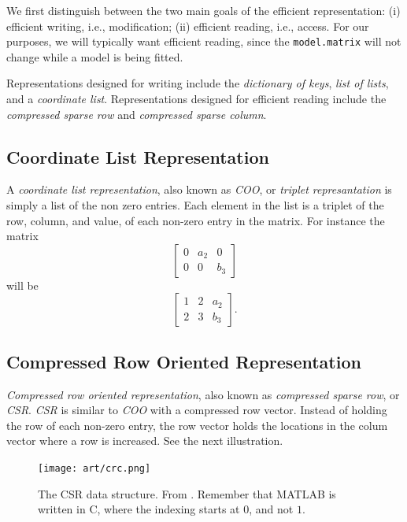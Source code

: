 \documentclass[]{book}
\theoremstyle{definition}
\theoremstyle{definition}
\theoremstyle{definition}
\theoremstyle{remark}
\begin{document}
We first distinguish between the two main goals of the efficient representation:
(i) efficient writing, i.e., modification;
(ii) efficient reading, i.e., access.
For our purposes, we will typically want efficient reading, since the \texttt{model.matrix} will not change while a model is being fitted.

Representations designed for writing include the \emph{dictionary of keys}, \emph{list of lists}, and a \emph{coordinate list}.
Representations designed for efficient reading include the \emph{compressed sparse row} and \emph{compressed sparse column}.

\hypertarget{coo}{%
\subsection{Coordinate List Representation}\label{coo}}

A \emph{coordinate list representation}, also known as \emph{COO}, or \emph{triplet represantation} is simply a list of the non zero entries.
Each element in the list is a triplet of the row, column, and value, of each non-zero entry in the matrix.
For instance the matrix
\[ \begin{bmatrix}
0 & a_2 & 0 \\
0 & 0 & b_3 
\end{bmatrix}  \]
will be
\[ \begin{bmatrix}
1 & 2 & a_2 \\
2 & 3 & b_3 
\end{bmatrix}.  \]

\hypertarget{compressed-row-oriented-representation}{%
\subsection{Compressed Row Oriented Representation}\label{compressed-row-oriented-representation}}

\emph{Compressed row oriented representation}, also known as \emph{compressed sparse row}, or \emph{CSR}.
\emph{CSR} is similar to \emph{COO} with a compressed row vector.
Instead of holding the row of each non-zero entry, the row vector holds the locations in the colum vector where a row is increased.
See the next illustration.

\begin{figure}
\centering
\texttt{[image: art/crc.png]}
\caption{The CSR data structure. From \citet{shah2004sparse}. Remember that MATLAB is written in C, where the indexing starts at \(0\), and not \(1\).}
\end{figure}
\end{document}
